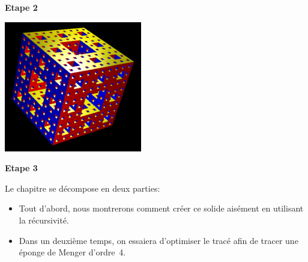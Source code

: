 \begin{center}
\begin{minipage}{6cm}
\begin{center}
 \textbf{Etape 2}
\end{center}
\end{minipage}
\begin{minipage}{6cm}
\includegraphics[width=6cm]{images/menger3.png}
\begin{center}
 \textbf{Etape 3}
\end{center}
\end{minipage}
\end{center}
Le chapitre se décompose en deux parties:
\begin{itemize}
 \item Tout d'abord, nous montrerons comment créer ce solide aisément en utilisant la récursivité.
 \item Dans un deuxième temps, on essaiera d'optimiser le tracé afin de tracer une éponge de Menger d'ordre~4.
\end{itemize}

